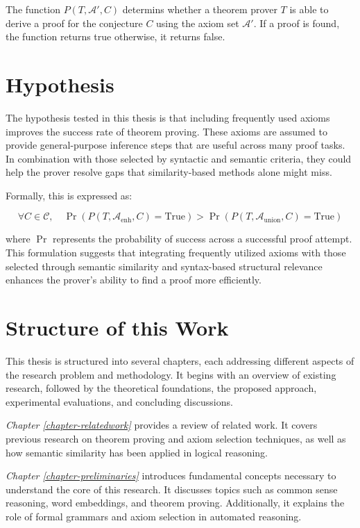 \documentclass[english,version-2020-11]{uzl-thesis}
\begin{document}
The function \( P(T, \mathcal{A}', C) \) determins whether a theorem prover \( T \) is able to derive a proof for the conjecture \( C \) using the axiom set \( \mathcal{A}' \). If a proof is found, the function returns true otherwise, it returns false.

\section{Hypothesis}

The hypothesis tested in this thesis is that including frequently used axioms improves the success rate of theorem proving. These axioms are assumed to provide general-purpose inference steps that are useful across many proof tasks. In combination with those selected by syntactic and semantic criteria, they could help the prover resolve gaps that similarity-based methods alone might miss.

Formally, this is expressed as:

\begin{equation}
    \forall C \in \mathcal{C}, \quad \Pr(P(T, \mathcal{A}_{\text{enh}}, C) = \text{True}) > \Pr(P(T, \mathcal{A}_{\text{union}}, C) = \text{True})
\end{equation}

where \( \Pr \) represents the probability of success across a successful proof attempt. This formulation suggests that integrating frequently utilized axioms with those selected through semantic similarity and syntax-based structural relevance enhances the prover’s ability to find a proof more efficiently.


\section{Structure of this Work}

This thesis is structured into several chapters, each addressing different aspects of the research problem and methodology. It begins with an overview of existing research, followed by the theoretical foundations, the proposed approach, experimental evaluations, and concluding discussions.

\textit{Chapter \ref{chapter-relatedwork}} provides a review of related work. It covers previous research on theorem proving and axiom selection techniques, as well as how semantic similarity has been applied in logical reasoning.

\textit{Chapter \ref{chapter-preliminaries}} introduces fundamental concepts necessary to understand the core of this research. It discusses topics such as common sense reasoning, word embeddings, and theorem proving. Additionally, it explains the role of formal grammars and axiom selection in automated reasoning.
\end{document}
